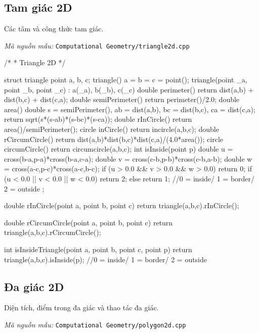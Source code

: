 \documentclass[11pt]{article}
\newcommand{\codepath}[1]{\par\noindent\textit{Mã nguồn mẫu:} \texttt{#1}\par}
\begin{document}
\subsection{Tam giác 2D}

Các tâm và công thức tam giác.

\codepath{Computational Geometry/triangle2d.cpp}

\begingroup\scriptsize
\begin{vncode}
/*
 * Triangle 2D
 */

struct triangle{
	point a, b, c;
	triangle() { a = b = c = point(); }
	triangle(point _a, point _b, point _c) : a(_a), b(_b), c(_c) {}
	double perimeter() { return dist(a,b) + dist(b,c) + dist(c,a); }
	double semiPerimeter() { return perimeter()/2.0; }
	double area() {
		double s = semiPerimeter(), ab = dist(a,b),
			bc = dist(b,c), ca = dist(c,a);
		return sqrt(s*(s-ab)*(s-bc)*(s-ca));
	}
	double rInCircle() {
		return area()/semiPerimeter();
	}
	circle inCircle() {
		return incircle(a,b,c);
	}
	double rCircumCircle() {
		return dist(a,b)*dist(b,c)*dist(c,a)/(4.0*area());
	}
	circle circumCircle() {
		return circumcircle(a,b,c);
	}
	int isInside(point p) {
		double u = cross(b-a,p-a)*cross(b-a,c-a);
		double v = cross(c-b,p-b)*cross(c-b,a-b);
		double w = cross(a-c,p-c)*cross(a-c,b-c);
		if (u > 0.0 && v > 0.0 && w > 0.0) return 0;
		if (u < 0.0 || v < 0.0 || w < 0.0) return 2;
		else return 1;
	} //0 = inside/ 1 = border/ 2 = outside
};

double rInCircle(point a, point b, point c) {
	return triangle(a,b,c).rInCircle();
}

double rCircumCircle(point a, point b, point c) {
	return triangle(a,b,c).rCircumCircle();
}

int isInsideTriangle(point a, point b, point c, point p) {
	return triangle(a,b,c).isInside(p);
} //0 = inside/ 1 = border/ 2 = outside
\end{vncode}
\endgroup


\subsection{Đa giác 2D}

Diện tích, điểm trong đa giác và thao tác đa giác.

\codepath{Computational Geometry/polygon2d.cpp}
\end{document}
